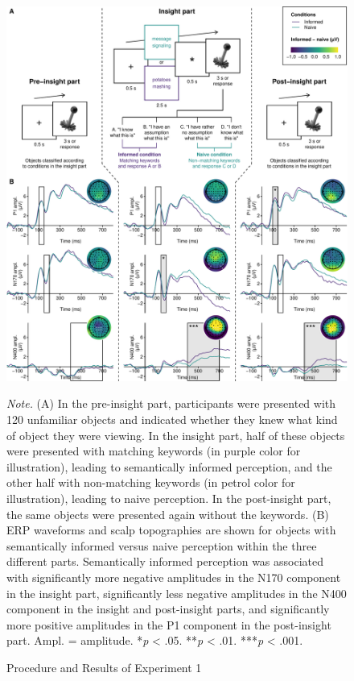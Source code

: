 \documentclass[
  english,
  doc,12pt,twoside,floatsintext]{apa7}
\begin{document}
\begin{figure}

\caption{Procedure and Results of Experiment 1\smallskip}\label{fig:exp1-plot}

{\centering \includegraphics[width=1\linewidth]{master_thesis_files/figure-latex/exp1-plot-1} 

}

\bigskip\small\textit{Note.} 
(A) In the pre-insight part, participants were presented with 120 unfamiliar objects and indicated whether they knew what kind of object they were viewing. In the insight part, half of these objects were presented with matching keywords (in purple color for illustration), leading to semantically informed perception, and the other half with non-matching keywords (in petrol color for illustration), leading to naive perception. In the post-insight part, the same objects were presented again without the keywords. (B) ERP waveforms and scalp topographies are shown for objects with semantically informed versus naive perception within the three different parts. Semantically informed perception was associated with significantly more negative amplitudes in the N170 component in the insight part, significantly less negative amplitudes in the N400 component in the insight and post-insight parts, and significantly more positive amplitudes in the P1 component in the post-insight part. Ampl. = amplitude.\newline
*\textit{p} \textless{} .05. **\textit{p} \textless{} .01. ***\textit{p} \textless{} .001.

\end{figure}
\end{document}
